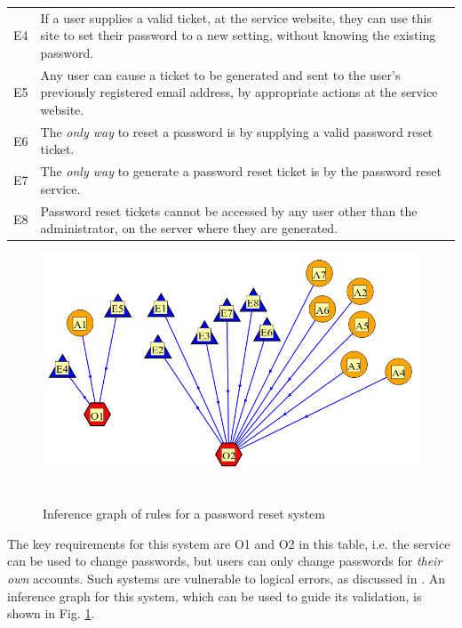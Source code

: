 \begin{table}[tb]
\begin{center}
\begin{tabular}{|c|p{9cm}|}
E4 & If a user supplies a valid ticket, at the service website, they can use this site to set their password to 
a new setting, without knowing the existing password.\\
E5 & Any user can cause a ticket to be generated and sent to the user's previously registered email address, by 
appropriate actions at the service website.\\
E6 & The {\em only way} to reset a password is by supplying a valid password reset ticket.\\
E7 & The {\em only way} to generate a password reset ticket is by the password
reset service.\\
E8 & Password reset tickets cannot be accessed by any user other than the administrator, on the server
where they are generated.\\
\hline
\end{tabular}
\end{center}
\end{table}

\begin{figure}[bhpt]
	\begin{centering}
		\leavevmode\includegraphics[width=12cm]{figures/pwreset.png}\ \\
		\caption{Inference graph of rules for a password reset system}\label{pwresetrules}
	\end{centering}
\end{figure}

The key requirements for this system are O1 and O2 in this table, i.e. the service can be used to change passwords, but users can only change passwords for {\em their own} accounts. Such systems are vulnerable to logical errors, as discussed in \cite{exptsandproofs}. An inference graph for this system, which can be used to guide its validation, is shown in Fig. \ref{pwresetrules}.


